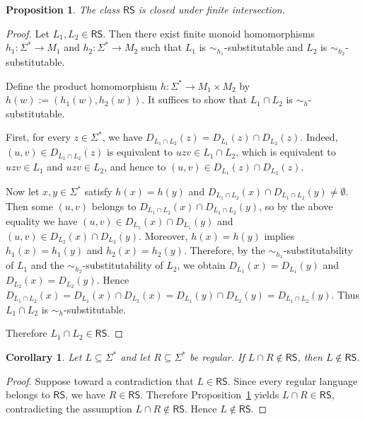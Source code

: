 \documentclass[11pt,a4paper]{article}
\newtheorem{proposition}[theorem]{Proposition}
\newtheorem{corollary}[theorem]{Corollary}
\begin{document}
\begin{proposition}
\label{prop:rs-intersection}
The class $\mathsf{RS}$ is closed under finite intersection.
\end{proposition}

\begin{proof}
Let $L_1,L_2\in\mathsf{RS}$. Then there exist finite monoid homomorphisms $h_1:\Sigma^*\to M_1$ and $h_2:\Sigma^*\to M_2$ such that $L_1$ is $\sim_{h_1}$-substitutable and $L_2$ is $\sim_{h_2}$-substitutable.

Define the product homomorphism $h:\Sigma^*\to M_1\times M_2$ by $h(w):=(h_1(w),h_2(w))$. It suffices to show that $L_1\cap L_2$ is $\sim_h$-substitutable.

First, for every $z\in\Sigma^*$, we have $D_{L_1\cap L_2}(z)=D_{L_1}(z)\cap D_{L_2}(z)$. Indeed, $(u,v)\in D_{L_1\cap L_2}(z)$ is equivalent to $uzv\in L_1\cap L_2$, which is equivalent to $uzv\in L_1$ and $uzv\in L_2$, and hence to $(u,v)\in D_{L_1}(z)\cap D_{L_2}(z)$.

Now let $x,y\in\Sigma^*$ satisfy $h(x)=h(y)$ and $D_{L_1\cap L_2}(x)\cap D_{L_1\cap L_2}(y)\neq\emptyset$. Then some $(u,v)$ belongs to $D_{L_1\cap L_2}(x)\cap D_{L_1\cap L_2}(y)$, so by the above equality we have $(u,v)\in D_{L_1}(x)\cap D_{L_1}(y)$ and $(u,v)\in D_{L_2}(x)\cap D_{L_2}(y)$. Moreover, $h(x)=h(y)$ implies $h_1(x)=h_1(y)$ and $h_2(x)=h_2(y)$. Therefore, by the $\sim_{h_1}$-substitutability of $L_1$ and the $\sim_{h_2}$-substitutability of $L_2$, we obtain $D_{L_1}(x)=D_{L_1}(y)$ and $D_{L_2}(x)=D_{L_2}(y)$. Hence $D_{L_1\cap L_2}(x)=D_{L_1}(x)\cap D_{L_2}(x)=D_{L_1}(y)\cap D_{L_2}(y)=D_{L_1\cap L_2}(y)$. Thus $L_1\cap L_2$ is $\sim_h$-substitutable.

Therefore $L_1\cap L_2\in\mathsf{RS}$.
\end{proof}

\begin{corollary}
\label{cor:non-rs-via-regular-intersection}
Let $L\subseteq\Sigma^*$ and let $R\subseteq\Sigma^*$ be regular. If $L\cap R\notin\mathsf{RS}$, then $L\notin\mathsf{RS}$.
\end{corollary}

\begin{proof}
Suppose toward a contradiction that $L\in\mathsf{RS}$. Since every regular language belongs to $\mathsf{RS}$, we have $R\in\mathsf{RS}$. Therefore Proposition~\ref{prop:rs-intersection} yields $L\cap R\in\mathsf{RS}$, contradicting the assumption $L\cap R\notin\mathsf{RS}$. Hence $L\notin\mathsf{RS}$.
\end{proof}
\end{document}
